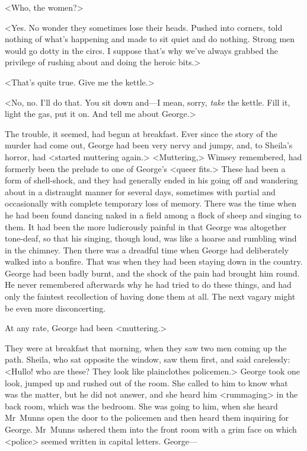 <Who, the women?>

<Yes. No wonder they sometimes lose their heads. Pushed into corners, told nothing of what's happening and made to sit quiet and do nothing. Strong men would go dotty in the circs. I suppose that's why we've always grabbed the privilege of rushing about and doing the heroic bits.>

<That's quite true. Give me the kettle.>

<No, no. I'll do that. You sit down and—I mean, sorry, \emph{take} the kettle. Fill it, light the gas, put it on. And tell me about George.>

The trouble, it seemed, had begun at breakfast. Ever since the story of the murder had come out, George had been very nervy and jumpy, and, to Sheila's horror, had <started muttering again.> <Muttering,> Wimsey remembered, had formerly been the prelude to one of George's <queer fits.> These had been a form of shell-shock, and they had generally ended in his going off and wandering about in a distraught manner for several days, sometimes with partial and occasionally with complete temporary loss of memory. There was the time when he had been found dancing naked in a field among a flock of sheep and singing to them. It had been the more ludicrously painful in that George was altogether tone-deaf, so that his singing, though loud, was like a hoarse and rumbling wind in the chimney. Then there was a dreadful time when George had deliberately walked into a bonfire. That was when they had been staying down in the country. George had been badly burnt, and the shock of the pain had brought him round. He never remembered afterwards why he had tried to do these things, and had only the faintest recollection of having done them at all. The next vagary might be even more disconcerting.

At any rate, George had been <muttering.>

They were at breakfast that morning, when they saw two men coming up the path. Sheila, who sat opposite the window, saw them first, and said carelessly: <Hullo! who are these? They look like plainclothes policemen.> George took one look, jumped up and rushed out of the room. She called to him to know what was the matter, but he did not answer, and she heard him <rummaging> in the back room, which was the bedroom. She was going to him, when she heard Mr~Munns open the door to the policemen and then heard them inquiring for George. Mr~Munns ushered them into the front room with a grim face on which <police> seemed written in capital letters. George—

